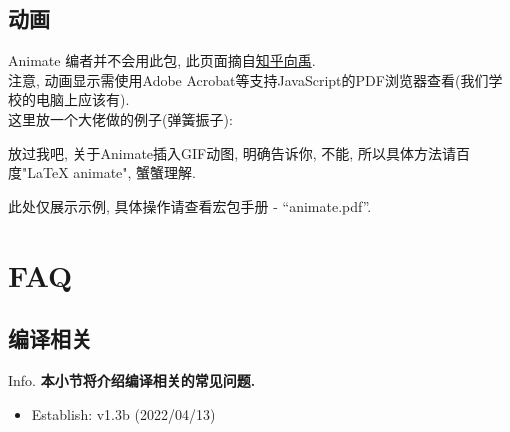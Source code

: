 \documentclass[hyperref, UTF8, CJK, aspectratio=169]{beamer}
\begin{document}
\subsection{动画}
\begin{frame}{Animate}
	编者并不会用此包, 此页面摘自\href{https://zhuanlan.zhihu.com/p/338402487}{\color{scublue}知乎向禹}.\\
	注意, 动画显示需使用Adobe Acrobat等支持JavaScript的PDF浏览器查看(我们学校的电脑上应该有).\\
	这里放一个大佬做的例子(弹簧振子):
	\begin{center}
		\begin{animateinline}[loop]{20}%
		\end{animateinline}
	\end{center}
	放过我吧, 关于Animate插入GIF动图, 明确告诉你, 不能, 所以具体方法请百度"LaTeX animate", 蟹蟹理解.\par
	\color{scugreen}此处仅展示示例, 具体操作请查看宏包手册 - ``animate.pdf''.
\end{frame}

\section{FAQ}
\subsection{编译相关}
\begin{frame}{Info.}
  \textbf{本小节将介绍编译相关的常见问题.}
  \begin{multicols}{2}
    \begin{itemize}
      \item Establish: \textcolor{scugreen}{v1.3b (2022/04/13)}
    \end{itemize}
  \end{multicols}
  \mycopyright
\end{frame}
\end{document}
